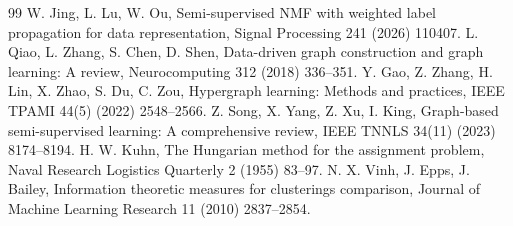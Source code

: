 \documentclass[times, review, 10pt]{elsarticle}
\begin{document}
\begin{thebibliography}{99}
 W. Jing, L. Lu, W. Ou, Semi-supervised NMF with weighted label propagation for data representation, Signal Processing 241 (2026) 110407.
 L. Qiao, L. Zhang, S. Chen, D. Shen, Data-driven graph construction and graph learning: A review, Neurocomputing 312 (2018) 336--351.
 Y. Gao, Z. Zhang, H. Lin, X. Zhao, S. Du, C. Zou, Hypergraph learning: Methods and practices, IEEE TPAMI 44(5) (2022) 2548--2566.
 Z. Song, X. Yang, Z. Xu, I. King, Graph-based semi-supervised learning: A comprehensive review, IEEE TNNLS 34(11) (2023) 8174--8194.
 H. W. Kuhn, The Hungarian method for the assignment problem, Naval Research Logistics Quarterly 2 (1955) 83--97.
 N. X. Vinh, J. Epps, J. Bailey, Information theoretic measures for clusterings comparison, Journal of Machine Learning Research 11 (2010) 2837--2854.
\end{thebibliography}
\end{document}

